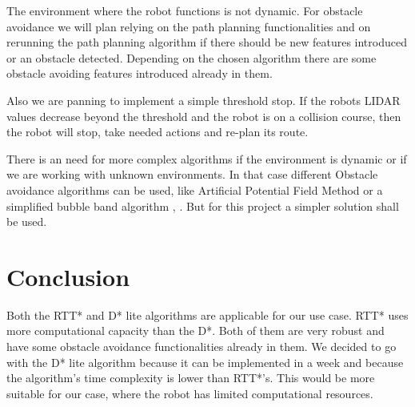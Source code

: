 \documentclass[12pt, a4paper, onecolumn]{article}
\begin{document}
The environment where the robot functions is not dynamic. For obstacle avoidance we will plan relying on the path planning functionalities and on rerunning the path planning algorithm if there should be new features introduced or an obstacle detected. Depending on the chosen algorithm there are some obstacle avoiding features introduced already in them. 

Also we are panning to implement a simple threshold stop. If the robots LIDAR values decrease beyond the threshold and the robot is on a collision course, then the robot will stop, take needed actions and re-plan its route.  

There is an need for more complex algorithms if the environment is dynamic or if we are working with unknown environments. In that case different Obstacle avoidance algorithms can be used, like Artificial Potential Field Method \cite{Rostami19} or a simplified bubble band algorithm\cite{OA09} ,  \cite{OA15}. But for this project a simpler solution shall be used.

\section{Conclusion}

Both the RTT* and D* lite algorithms are applicable for our use case.
RTT* uses more computational capacity than the D*. Both of them are very robust and have some obstacle avoidance functionalities already in them. 
We decided to go with the D* lite algorithm because it can be implemented in a week and because the algorithm's time complexity is lower than RTT*'s. This would be more suitable for our case, where the robot has limited computational resources. 
\end{document}
